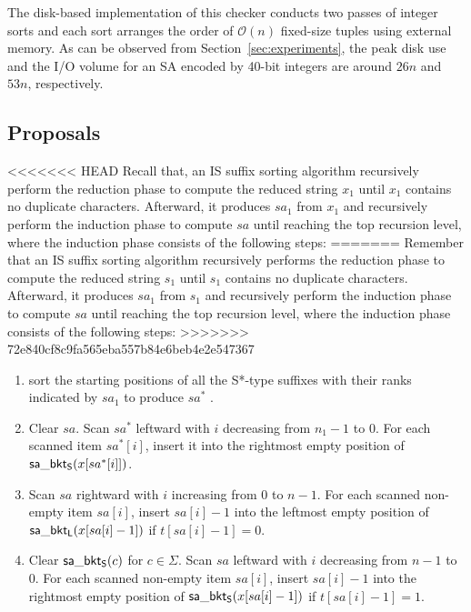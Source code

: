 \documentclass[10pt,journal,compsoc]{IEEEtran}
\begin{document}
The disk-based implementation of this checker conducts two passes of integer sorts and each sort arranges the order of $\mathcal{O}(n)$ fixed-size tuples using external memory. As can be observed from Section~\ref{sec:experiments}, the peak disk use and the I/O volume for an SA encoded by 40-bit integers are around $26n$ and $53n$, respectively.

\subsection{Proposals} \label{sec:checkers:proposals}

<<<<<<< HEAD
Recall that, an IS suffix sorting algorithm recursively perform the reduction phase to compute the reduced string $x_1$ until $x_1$ contains no duplicate characters. Afterward, it produces $sa_1$ from $x_1$ and recursively perform the induction phase to compute $sa$ until reaching the top recursion level, where the induction phase consists of the following steps:
=======
Remember that an IS suffix sorting algorithm recursively performs the reduction phase to compute the reduced string $s_1$ until $s_1$ contains no duplicate characters. Afterward, it produces $sa_1$ from $s_1$ and recursively perform the induction phase to compute $sa$ until reaching the top recursion level, where the induction phase consists of the following steps:
>>>>>>> 72e840cf8c9fa565eba557b84e6beb4e2e547367

\begin{enumerate}[S1'']
	\item sort the starting positions of all the S*-type suffixes with their ranks indicated by $sa_1$ to produce $sa^*$ \label{induction_phase:1}.

	\item Clear $sa$. Scan $sa^*$ leftward with $i$ decreasing from $n_1 - 1$ to $0$. For each scanned item $sa^*[i]$, insert it into the rightmost empty position of ${\sf sa\_bkt_S}(x[sa^*[i]])$. \label{induction_phase:2}
	
	\item Scan $sa$ rightward with $i$ increasing from $0$ to $n - 1$. For each scanned non-empty item $sa[i]$, insert $sa[i] - 1$ into the leftmost empty position of ${\sf sa\_bkt_L}(x[sa[i] - 1])$ if $t[sa[i] - 1] = 0$.\label{induction_phase:3}
	
	\item Clear ${\sf sa\_bkt_S}(c)$ for $c \in \Sigma$. Scan $sa$ leftward with $i$ decreasing from $n - 1$ to $0$. For each scanned non-empty item $sa[i]$, insert $sa[i] - 1$ into the rightmost empty position of ${\sf sa\_bkt_S}(x[sa[i] - 1])$ if $t[sa[i] - 1] = 1$.\label{induction_phase:4}
	
\end{enumerate}
\end{document}
